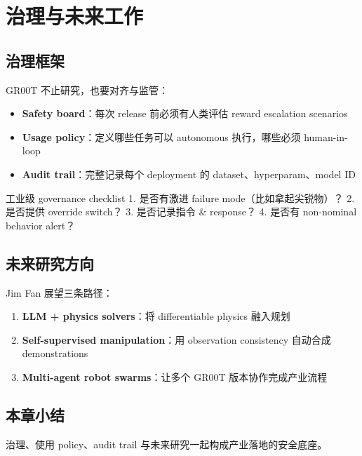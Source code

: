 \section{治理与未来工作}

\subsection{治理框架}

GR00T 不止研究，也要对齐与监管：

\begin{itemize}
    \item \textbf{Safety board}：每次 release 前必须有人类评估 reward escalation scenarios
    \item \textbf{Usage policy}：定义哪些任务可以 autonomous 执行，哪些必须 human-in-loop
    \item \textbf{Audit trail}：完整记录每个 deployment 的 dataset、hyperparam、model ID
\end{itemize}

\begin{importantbox}{工业级 governance checklist}
1. 是否有激进 failure mode（比如拿起尖锐物）？ 2. 是否提供 override switch？ 3. 是否记录指令 \& response？ 4. 是否有 non-nominal behavior alert？
\end{importantbox}

\subsection{未来研究方向}

Jim Fan 展望三条路径：

\begin{enumerate}
    \item \textbf{LLM + physics solvers}：将 differentiable physics 融入规划
    \item \textbf{Self-supervised manipulation}：用 observation consistency 自动合成 demonstrations
    \item \textbf{Multi-agent robot swarms}：让多个 GR00T 版本协作完成产业流程
\end{enumerate}

\subsection{本章小结}

治理、使用 policy、audit trail 与未来研究一起构成产业落地的安全底座。

